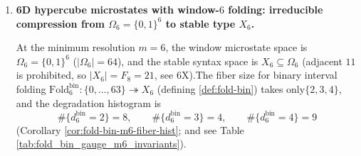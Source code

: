 \begin{enumerate}
\begin{remark}\label{rem:terminal-time-golden-rotation-operational}In addition to the ontology description (theorem \ref{thm:terminal-time-protocol-golden-branch}) of "time = iteration count" at the protocol layer, if the reset event defining \ref{def:terminal-reset-events} is used as the event clock scale, then its indication sequence is given by theorem \ref{thm:terminal-reset-events-sturmian} as a Sturmian process of slope \(\varphi^{-1}\), which is equivalent to the symbolic encoding of golden angle rotation.Therefore, the strict meaning of "time = golden slice rotation" in the framework of this article is: time advancement under limited window observation has an equivalent interface implemented with a golden rotation return time structure, rather than identifying the tick itself as a rotation geometry.  \end{remark}

\item \textbf{6D hypercube microstates with window-\(6\) folding: irreducible compression from \(\Omega_6=\{0,1\}^6\) to stable type \(X_6\). }
\begin{theorem}   \label{thm:terminal-foldbin6-64-to-21-hist}
At the minimum resolution \(m=6\), the window microstate space is \(\Omega_6=\{0,1\}^6\) (\(|\Omega_6|=64\)), and the stable syntax space is \(X_6\subseteq\Omega_6\) (adjacent \(11\) is prohibited, so \(|X_6|=F_8=21\), see \SXPH6X).The fiber size for binary interval folding \(\mathrm{Fold}^{\mathrm{bin}}_6:\{0,\dots,63\}\twoheadrightarrow X_6\) (defining \ref{def:fold-bin}) takes only\(\{2,3,4\}\), and the degradation histogram is  \[
  \#\{d^{\mathrm{bin}}_6=2\}=8,\qquad
  \#\{d^{\mathrm{bin}}_6=3\}=4,\qquad
  \#\{d^{\mathrm{bin}}_6=4\}=9
  \]
(Corollary \ref{cor:fold-bin-m6-fiber-hist}; and see Table \ref{tab:fold_bin_gauge_m6_invariants}).  \end{theorem}

  


\end{enumerate}
